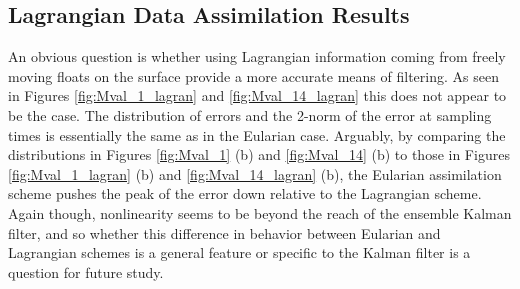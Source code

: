 

\subsection*{Lagrangian Data Assimilation Results}

An obvious question is whether using Lagrangian information coming from freely moving floats on the surface provide a more accurate means of filtering.  As seen in Figures \ref{fig:Mval_1_lagran} and \ref{fig:Mval_14_lagran} this does not appear to be the case.  The distribution of errors and the 2-norm of the error at sampling times is essentially the same as in the Eularian case.  Arguably, by comparing the distributions in Figures \ref{fig:Mval_1} (b) and \ref{fig:Mval_14} (b) to those in Figures \ref{fig:Mval_1_lagran} (b) and \ref{fig:Mval_14_lagran} (b), the Eularian assimilation scheme pushes the peak of the error down relative to the Lagrangian scheme.  Again though, nonlinearity seems to be beyond the reach of the ensemble Kalman filter, and so whether this difference in behavior between Eularian and Lagrangian schemes is a general feature or specific to the Kalman filter is a question for future study.   

